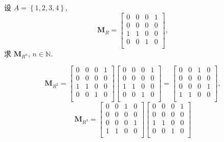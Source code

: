 \documentclass[10pt,UTF8]{book} %
\begin{document}
\begin{exercise}
    设 $A = \left\{1,2,3,4\right\}$,
    \[ \boldsymbol{M}_R = \begin{bmatrix}
        0 & 0 & 0 & 1 \\
        0 & 0 & 0 & 0 \\
        1 & 1 & 0 & 0 \\
        0 & 0 & 1 & 0 \\
    \end{bmatrix}, \]
    求 $\boldsymbol{M}_{R^n}$, $n \in \mathbb{N}$.
    \begin{sol}
        \[ \boldsymbol{M}_{R^2} = \begin{bmatrix}
            0 & 0 & 0 & 1 \\
            0 & 0 & 0 & 0 \\
            1 & 1 & 0 & 0 \\
            0 & 0 & 1 & 0 \\
        \end{bmatrix} \begin{bmatrix}
            0 & 0 & 0 & 1 \\
            0 & 0 & 0 & 0 \\
            1 & 1 & 0 & 0 \\
            0 & 0 & 1 & 0 \\
        \end{bmatrix}
        = \begin{bmatrix}
            0 & 0 & 1 & 0 \\
            0 & 0 & 0 & 0 \\
            0 & 0 & 0 & 1 \\
            1 & 1 & 0 & 0 \\
        \end{bmatrix}, \]
        \[ \boldsymbol{M}_{R^3} = \begin{bmatrix}
            0 & 0 & 1 & 0 \\
            0 & 0 & 0 & 0 \\
            0 & 0 & 0 & 1 \\
            1 & 1 & 0 & 0 \\
        \end{bmatrix} \begin{bmatrix}
            0 & 0 & 0 & 1 \\
            0 & 0 & 0 & 0 \\
            1 & 1 & 0 & 0 \\
            0 & 0 & 1 & 0 \\
        \end{bmatrix}
\]
\end{sol}
\end{exercise}
\end{document}
